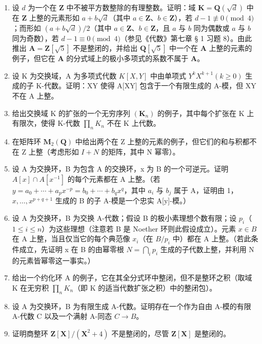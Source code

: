 \begin{enumerate}
\def\labelenumi{\arabic{enumi}.}
\item
  设 \(d\) 为一个在 \(\mathbf{Z}\) 中不被平方数整除的有理整数。证明：域 \(\mathbf{K} = \mathbf{Q}(\sqrt{d})\) 中在 \(\mathbf{Z}\) 上整的元素形如 \(a + b\sqrt{d}\)（其中 \(a \in \mathbf{Z}\)、\(b \in \mathbf{Z}\)），若 \(d - 1 \not\equiv 0 \pmod{4}\)；而形如 \((a + b\sqrt{d})/2\)（其中 \(a \in \mathbf{Z}\)、\(b \in \mathbf{Z}\)，且 \(a\) 与 \(b\) 同为偶数或 \(a\) 与 \(b\) 同为奇数），若 \(d - 1 \equiv 0 \pmod{4}\)（参见《代数》第七章 § 1 习题 8）。由此推出 \(\mathbf{A} = \mathbf{Z}[\sqrt{5}]\) 不是整闭的，并给出 \(\mathbf{Q}[\sqrt{5}]\) 中一个在 \(\mathbf{A}\) 上整的元素的例子，但它在 \(\mathbf{A}\) 的分式域上的极小多项式的系数不属于 \(\mathbf{A}\)。
\item
  设 K 为交换域，A 为多项式代数 \(K[X, Y]\) 中由单项式 \(Y^{k}X^{k+1} (k \geqslant 0)\) 生成的子 K-代数。证明：XY 使得 A{[}XY{]} 包含于一个有限生成的 A-模，但 XY 不在 A 上整。
\item
  给出交换域 K 的扩张的一个无穷序列 \((\mathbf{K}_{n})\) 的例子，其中每个扩张在 K 上有限次，使得 K-代数 \(\prod_{n} K_{n}\) 不在 K 上代数。
\item
  在矩阵环 \(\mathbf{M}_{2}(\mathbf{Q})\) 中给出两个在 Z 上整的元素的例子，但它们的和与积都不在 Z 上整（考虑形如 \(I + N\) 的矩阵，其中 N 幂零）。
\item
  设 A 为交换环，B 为包含 A 的交换环，x 为 B 的一个可逆元。证明 \(A[x] \cap A[x^{-1}]\) 的每个元素都在 A 上整。（若 \(y = a_{0} + \cdots + a_{p}x^{-p} = b_{0} + \cdots + b_{q}x^{q}\)，其中 \(a_{i}\) 与 \(b_{j}\) 属于 A，证明由 1，\(x, \ldots, x^{p+q+1}\) 生成的 B 的子 A-模是一个忠实 A{[}y{]}-模。）
\item
  设 A 为交换环，B 为交换 A-代数；假设 B 的极小素理想个数有限；设 \(p_{i}\)（\(1 \leqslant i \leqslant n\)）为这些理想（注意若 B 是 Noether 环则此假设成立）。元素 \(x \in B\) 在 A 上整，当且仅当它的每个典范像 \(x_{i}\)（在 \(B/p_{i}\) 中）都在 A 上整。（若此条件成立，先证明 x 在 B 的由幂零根 \(N = \bigcap_{i} p_{i}\) 生成的子代数上整，并利用 N 的元素皆幂零这一事实。）
\item
  给出一个约化环 A 的例子，它在其全分式环中整闭，但不是整环之积（取域 K 在无穷积 \(\prod_{n} K_{n}\)（即 K 的适当代数扩张之积）中的整闭包）。
\item
  设 A 为交换环，B 为有限生成 A-代数。证明存在一个作为自由 A-模的有限 A-代数 C 以及一个满射 A-同态 \(C \rightarrow B\)。
\item
  证明商整环 \(\mathbf{Z}[\mathbf{X}] / (\mathbf{X}^2 +4)\) 不是整闭的，尽管 \(\mathbf{Z}[\mathbf{X}]\) 是整闭的。

\end{enumerate}
